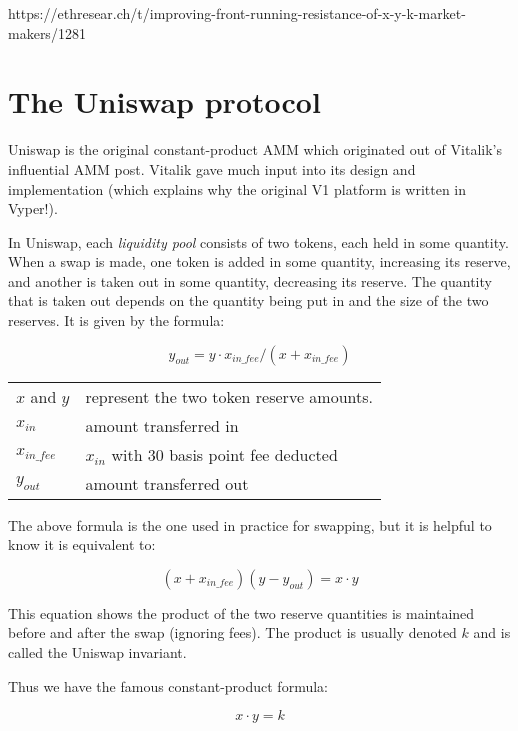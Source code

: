 \documentclass[nohyper]{tufte-handout}
\begin{document}
https://ethresear.ch/t/improving-front-running-resistance-of-x-y-k-market-makers/1281


\section{The Uniswap protocol}\label{uniswap}


Uniswap is the original constant-product AMM which originated out of Vitalik's influential AMM post.  Vitalik gave much input into its design and implementation (which explains why the original V1 platform is written in Vyper!).  

In Uniswap, each \emph{liquidity pool} consists of two tokens, each held in some quantity.  When a swap is made, one token is added in some quantity, increasing its reserve, and another is taken out in some quantity, decreasing its reserve.  The quantity that is taken out depends on the quantity being put in and the size of the two reserves.  It is given by the formula:

\begin{equation}
    y_{out} = y \cdot x_{in\_fee} / (x + x_{in\_fee}) 
\end{equation}


\begin{tabular}{@{\qquad }ll}
$x$ and $y$ & represent the two token reserve amounts.\\
$x_{in}$ & amount transferred in\\
$x_{in\_fee}$ & $x_{in}$ with 30 basis point fee deducted\\
$y_{out}$ & amount transferred out \\
\end{tabular}

The above formula is the one used in practice for swapping, but it is helpful to know it is equivalent to:

\begin{equation}
    (x + x_{in\_fee}) (y - y_{out}) = x \cdot y
\end{equation}

This equation shows the product of the two reserve quantities is maintained before and after the swap (ignoring fees).  The product is usually denoted $k$ and is called the Uniswap invariant.

Thus we have the famous constant-product formula: 

\begin{equation}
x \cdot y = k
\end{equation}
\end{document}
